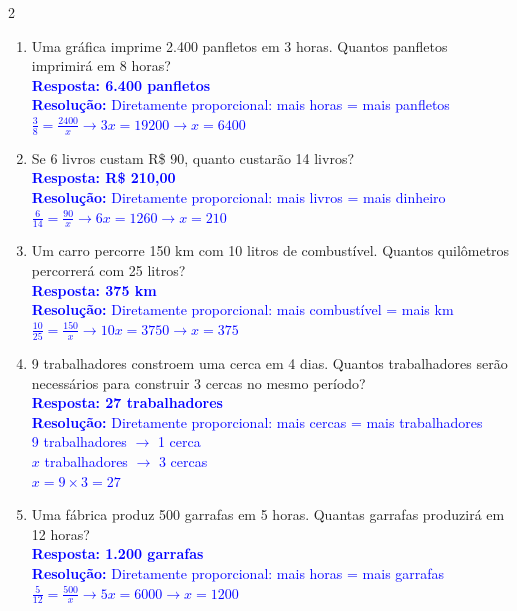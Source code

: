 \documentclass[11pt]{article}
\begin{document}
\begin{multicols}{2}
\begin{enumerate}[leftmargin=*, itemsep=2pt]
\item Uma gráfica imprime 2.400 panfletos em 3 horas. Quantos panfletos imprimirá em 8 horas? \\
\textcolor{blue}{\textbf{Resposta: 6.400 panfletos}} \\
\textcolor{blue}{\textbf{Resolução:} Diretamente proporcional: mais horas = mais panfletos} \\
\textcolor{blue}{$\frac{3}{8} = \frac{2400}{x} \rightarrow 3x = 19200 \rightarrow x = 6400$}

\item Se 6 livros custam R\$ 90, quanto custarão 14 livros? \\
\textcolor{blue}{\textbf{Resposta: R\$ 210,00}} \\
\textcolor{blue}{\textbf{Resolução:} Diretamente proporcional: mais livros = mais dinheiro} \\
\textcolor{blue}{$\frac{6}{14} = \frac{90}{x} \rightarrow 6x = 1260 \rightarrow x = 210$}

\item Um carro percorre 150 km com 10 litros de combustível. Quantos quilômetros percorrerá com 25 litros? \\
\textcolor{blue}{\textbf{Resposta: 375 km}} \\
\textcolor{blue}{\textbf{Resolução:} Diretamente proporcional: mais combustível = mais km} \\
\textcolor{blue}{$\frac{10}{25} = \frac{150}{x} \rightarrow 10x = 3750 \rightarrow x = 375$}

\item 9 trabalhadores constroem uma cerca em 4 dias. Quantos trabalhadores serão necessários para construir 3 cercas no mesmo período? \\
\textcolor{blue}{\textbf{Resposta: 27 trabalhadores}} \\
\textcolor{blue}{\textbf{Resolução:} Diretamente proporcional: mais cercas = mais trabalhadores} \\
\textcolor{blue}{9 trabalhadores $\rightarrow$ 1 cerca} \\
\textcolor{blue}{$x$ trabalhadores $\rightarrow$ 3 cercas} \\
\textcolor{blue}{$x = 9 \times 3 = 27$}

\item Uma fábrica produz 500 garrafas em 5 horas. Quantas garrafas produzirá em 12 horas? \\
\textcolor{blue}{\textbf{Resposta: 1.200 garrafas}} \\
\textcolor{blue}{\textbf{Resolução:} Diretamente proporcional: mais horas = mais garrafas} \\
\textcolor{blue}{$\frac{5}{12} = \frac{500}{x} \rightarrow 5x = 6000 \rightarrow x = 1200$}


\end{enumerate}
\end{multicols}
\end{document}
